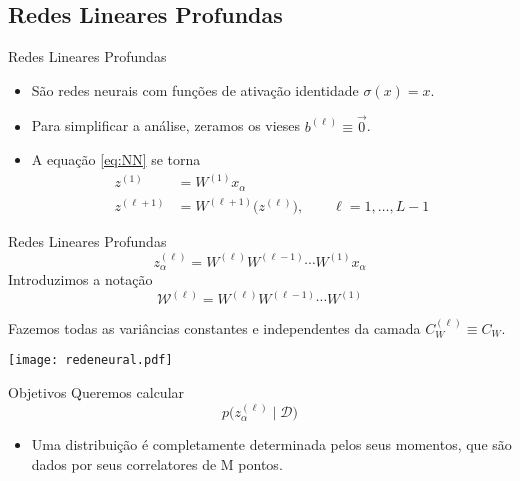 \documentclass{beamer}
\newcommand{\WW}{\mathcal{W}}
\begin{document}
\subsection{Redes Lineares Profundas}
\begin{frame}{Redes Lineares Profundas}
	\begin{itemize}
		\item São redes neurais com funções de ativação identidade $\sigma(x) = x$.
		\item Para simplificar a análise, zeramos os vieses $b^{(\ell)} \equiv \vec{0}$.
		\item A equação \eqref{eq:NN} se torna
		\begin{align*}
			z^{(1)} &= W^{(1)} x_\alpha \\ 	
			z^{(\ell+1)} &= W^{(\ell+1)}\big(z^{(\ell)}\big), \qquad \ell = 1, \ldots, L-1 
		\end{align*}
	\end{itemize}
\end{frame}
\begin{frame}{Redes Lineares Profundas}
	\begin{equation*}\tag{3.2}\label{eq:zele}
		z^{(\ell)}_\alpha = W^{(\ell)}W^{(\ell-1)}\cdots W^{(1)} x_\alpha
	\end{equation*}
Introduzimos a notação 
	\begin{equation*}\tag{3.3}\label{eq:Wcali}
		\WW^{(\ell)} = W^{(\ell)}W^{(\ell-1)}\cdots W^{(1)}
	\end{equation*}

Fazemos todas as variâncias constantes e independentes da camada $C_W^{(\ell)} \equiv C_W$. 
\end{frame}


\begin{frame}
	\texttt{[image: redeneural.pdf]}
\end{frame}


\begin{frame}{Objetivos}
	Queremos calcular 
	$$p\big(z^{(\ell)}_\alpha\mid \mathcal{D}\big) $$ 
\begin{itemize}
	\item 
	Uma distribuição é completamente determinada pelos seus momentos, que são dados por seus correlatores de M pontos.
\end{itemize}
\end{frame}
\end{document}

